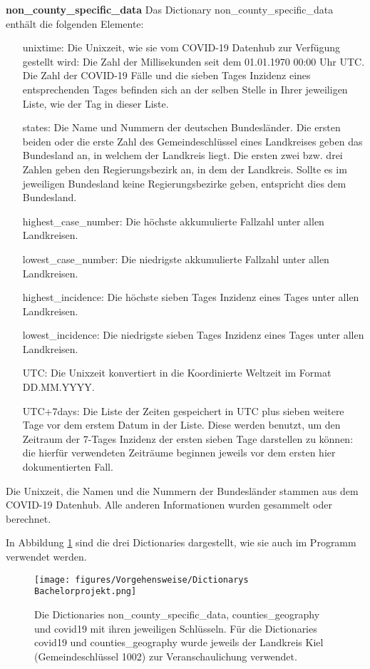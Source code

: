 \textbf{non\_county\_specific\_data}
Das Dictionary non\_county\_specific\_data enthält die folgenden Elemente:
\begin{itemize}
    \item[unixtime:] Die Unixzeit, wie sie vom COVID-19 Datenhub zur Verfügung gestellt wird: Die Zahl der Millisekunden seit dem 01.01.1970 00:00 Uhr UTC. Die Zahl der COVID-19 Fälle und die sieben Tages Inzidenz eines entsprechenden Tages befinden sich an der selben Stelle in Ihrer jeweiligen Liste, wie der Tag in dieser Liste.
    \item[states:] Die Name und Nummern der deutschen Bundesländer. Die ersten beiden oder die erste Zahl des Gemeindeschlüssel eines Landkreises geben das Bundesland an, in welchem der Landkreis liegt. Die ersten zwei bzw. drei Zahlen geben den Regierungsbezirk an, in dem der Landkreis. Sollte es im jeweiligen Bundesland keine Regierungsbezirke geben, entspricht dies dem Bundesland.
    \item[highest\_case\_number:] Die höchste akkumulierte Fallzahl unter allen Landkreisen.
    \item[lowest\_case\_number:] Die niedrigste akkumulierte Fallzahl unter allen Landkreisen.
    \item[highest\_incidence:] Die höchste sieben Tages Inzidenz eines Tages unter allen Landkreisen.
    \item[lowest\_incidence:] Die niedrigste sieben Tages Inzidenz eines Tages unter allen Landkreisen.
    \item[UTC:] Die Unixzeit konvertiert in die Koordinierte Weltzeit im Format \glqq{}DD.MM.YYYY\grqq{}.
    \item[UTC+7days:] Die Liste der Zeiten gespeichert in UTC plus sieben weitere Tage vor dem erstem Datum in der Liste. Diese werden benutzt, um den Zeitraum der 7-Tages Inzidenz der ersten sieben Tage darstellen zu können: die hierfür verwendeten Zeiträume beginnen jeweils vor dem ersten hier dokumentierten Fall.
\end{itemize}
Die Unixzeit, die Namen und die Nummern der Bundesländer stammen aus dem \glqq{}COVID-19 Datenhub\grqq{}. Alle anderen Informationen wurden gesammelt oder berechnet.

In Abbildung \ref{fig:dicts_als_code} sind die drei Dictionaries dargestellt, wie sie auch im Programm verwendet werden.
\begin{figure}[H]
    \centering
    \texttt{[image: figures/Vorgehensweise/Dictionarys Bachelorprojekt.png]}
    \caption{
    Die Dictionaries non\_county\_specific\_data, counties\_geography und covid19 mit ihren jeweiligen Schlüsseln.
    Für die Dictionaries covid19 und counties\_geography wurde jeweils der Landkreis Kiel (Gemeindeschlüssel 1002) zur Veranschaulichung verwendet.}
    \label{fig:dicts_als_code}
\end{figure}

